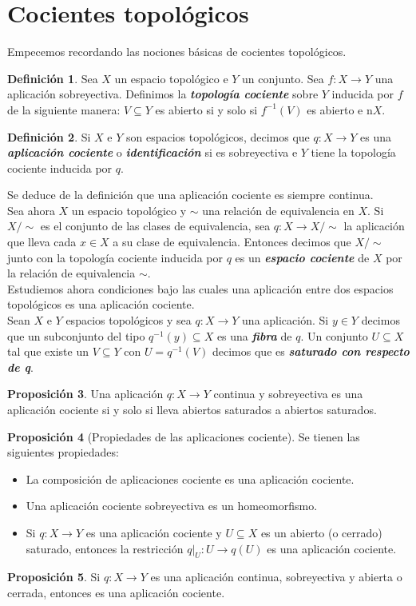 \documentclass[10pt]{report}
\newcommand{\enfatiza}[1]{\textbf{\textit{#1}}}
\theoremstyle{definition}
\newtheorem{defin}{Definición}[section]
\newtheorem{prop}[defin]{Proposición}
\begin{document}
\section{Cocientes topológicos}
Empecemos recordando las nociones básicas de cocientes topológicos.
\begin{defin}
Sea $X$ un espacio topológico e $Y$ un conjunto. Sea $f:X\to Y$ una aplicación sobreyectiva. Definimos la \enfatiza{topología cociente} sobre $Y$ inducida por $f$ de la siguiente manera: $V\subseteq Y$ es abierto si y solo si $f^{-1}(V)$ es abierto e n$X$.
\end{defin}
\begin{defin}
Si $X$ e $Y$ son espacios topológicos, decimos que  $q:X\to Y$ es una \enfatiza{aplicación cociente} o \enfatiza{identificación} si es sobreyectiva e $Y$ tiene la topología cociente inducida por $q$.
\end{defin}
Se deduce de la definición que una aplicación cociente es siempre continua.\\
Sea ahora $X$ un espacio topológico y $\sim$ una relación de equivalencia en $X$. Si $X/\sim$ es el conjunto de las clases de equivalencia, sea $q:X\to X/\sim$ la aplicación que lleva cada $x\in X$ a su clase de equivalencia. Entonces decimos que $X/\sim$ junto con la topología cociente inducida por $q$ es un \enfatiza{espacio cociente} de $X$ por la relación de equivalencia $\sim$.\\
Estudiemos ahora condiciones bajo las cuales una aplicación entre dos espacios topológicos es una aplicación cociente.\\
Sean $X$ e $Y$ espacios topológicos y sea $q:X\to Y$ una aplicación. Si $y\in Y$ decimos que un subconjunto del tipo $q^{-1}(y)\subseteq X$ es una \enfatiza{fibra} de $q$. Un conjunto $U\subseteq X$ tal que existe un $V\subseteq Y$ con $U=q^{-1}(V)$ decimos que es \enfatiza{saturado con respecto de q}.
\begin{prop}
Una aplicación $q:X\to Y$ continua y sobreyectiva es una aplicación cociente si y solo si lleva abiertos saturados a abiertos saturados.
\end{prop}

\begin{prop}[Propiedades de las aplicaciones cociente]
Se tienen las siguientes propiedades:
\begin{itemize}
\item La composición de aplicaciones cociente es una aplicación cociente.
\item Una aplicación cociente sobreyectiva es un homeomorfismo.
\item Si $q:X\to Y$ es una aplicación cociente y $U\subseteq X$ es un abierto (o cerrado) saturado, entonces la restricción $q|_U:U\to q(U)$ es una aplicación cociente.
\end{itemize}
\end{prop}
\begin{prop}
Si $q:X\to Y$ es una aplicación continua, sobreyectiva y abierta o cerrada, entonces es una aplicación cociente.
\end{prop}
\end{document}
